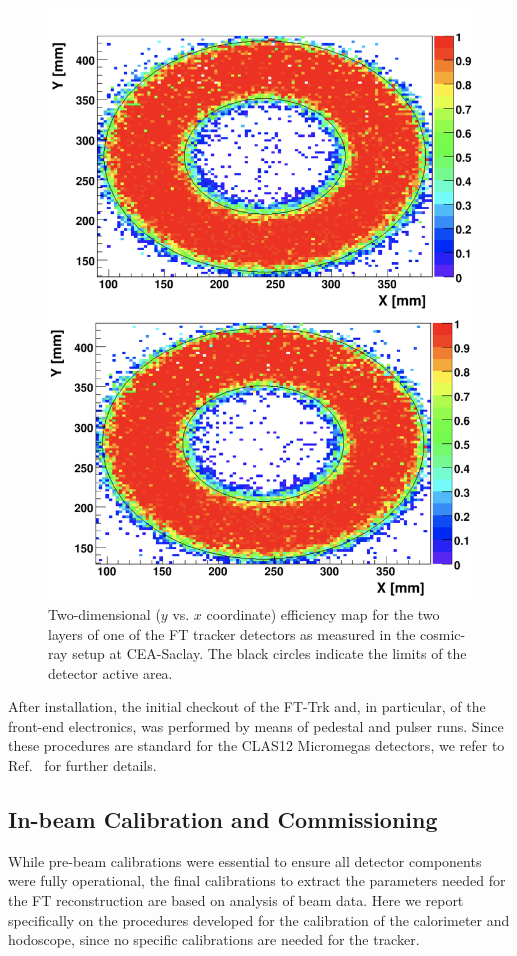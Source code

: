 \begin{figure}[htb]
  \centering
 \includegraphics[width=0.9\columnwidth,height=0.6\textheight]{fig/fttrk_cosmic.png}
 \caption{Two-dimensional ($y$ vs. $x$ coordinate) efficiency map for the two layers of one of the FT tracker
   detectors as measured in the cosmic-ray setup at CEA-Saclay. The black circles indicate the limits of the detector
   active area.}
 \label{fig:ftt_cosmic}
\end{figure}

After installation, the initial checkout of the FT-Trk and, in particular, of the front-end electronics, was performed
by means of pedestal and pulser runs. Since these procedures are standard for the CLAS12 Micromegas detectors,
we refer to Ref.~\cite{mm} for further details.

\subsection{In-beam Calibration and Commissioning}

While pre-beam calibrations were essential to ensure all detector components were fully operational, the final
calibrations to extract the parameters needed for the FT reconstruction are based on analysis of beam data.
Here we report specifically on the procedures developed for the calibration of the calorimeter and hodoscope,
since no specific calibrations are needed for the tracker.

